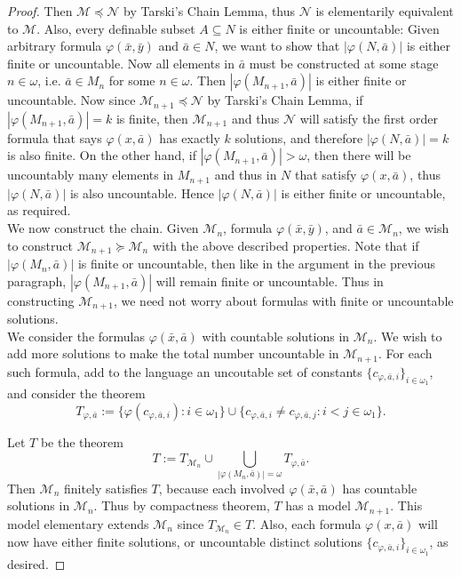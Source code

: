 \documentclass{article}
\begin{document}
\begin{enumerate}[label={\bf Q\arabic*:}]
\begin{proof}
      Then $\mathcal{M}\preceq\mathcal{N}$ by Tarski's Chain Lemma, thus
      $\mathcal{N}$ is elementarily equivalent to $\mathcal{M}$. Also,
      every definable subset $A\subseteq N$ is either finite or
      uncountable: Given arbitrary formula $\varphi(\bar{x},\bar{y})$ and
      $\bar{a}\in N$, we want to show that $|\varphi(N,\bar{a})|$ is
      either finite or uncountable. Now all elements in $\bar{a}$ must be
      constructed at some stage $n\in\omega$, i.e. $\bar{a}\in M_n$ for
      some $n\in\omega$. Then $|\varphi(M_{n+1},\bar{a})|$ is either finite
      or uncountable. Now since $\mathcal{M}_{n+1}\preceq\mathcal{N}$ by
      Tarski's Chain Lemma, if $|\varphi(M_{n+1},\bar{a})|=k$ is finite, then
      $\mathcal{M}_{n+1}$ and thus $\mathcal{N}$ will satisfy the first
      order formula that says $\varphi(x,\bar{a})$ has exactly $k$
      solutions, and therefore $|\varphi(N,\bar{a})|=k$ is also finite. On
      the other hand, if $|\varphi(M_{n+1},\bar{a})|>\omega$, then there
      will be uncountably many elements in $M_{n+1}$ and thus in $N$ that
      satisfy $\varphi(x,\bar{a})$, thus $|\varphi(N,\bar{a})|$ is also
      uncountable. Hence $|\varphi(N,\bar{a})|$ is either finite or
      uncountable, as required. \\

      We now construct the chain. Given $\mathcal{M}_n$, formula
      $\varphi(\bar{x},\bar{y})$, and $\bar{a}\in\mathcal{M}_n$, we wish to
      construct $\mathcal{M}_{n+1}\succeq\mathcal{M}_n$ with the above
      described properties. Note that if $|\varphi(M_n,\bar{a})|$ is finite
      or uncountable, then like in the argument in the previous paragraph,
      $|\varphi(M_{n+1},\bar{a})|$ will remain finite or uncountable. Thus
      in constructing $\mathcal{M}_{n+1}$, we need not worry about formulas
      with finite or uncountable solutions. \\

      We consider the formulas $\varphi(\bar{x},\bar{a})$ with countable
      solutions in $\mathcal{M}_n$. We wish to add more solutions to make
      the total number uncountable in $\mathcal{M}_{n+1}$. For each such
      formula, add to the language an uncoutable set of constants
      $\{c_{\varphi,\bar{a},i}\}_{i\in\omega_1}$, and consider the theorem
      \[T_{\varphi,\bar{a}}:= \{\varphi(c_{\varphi,\bar{a},i}):
        i\in\omega_1\} \cup \{c_{\varphi,\bar{a},i}\neq
        c_{\varphi,\bar{a},j}: i<j\in\omega_1\}.\]

      Let $T$ be the theorem
      \[T:= T_{\mathcal{M}_n}\cup \bigcup_{|\varphi(M_n,\bar{a})|=\omega}
        T_{\varphi,\bar{a}}.\]
      Then $\mathcal{M}_n$ finitely satisfies $T$, because each involved
      $\varphi(\bar{x},\bar{a})$ has countable solutions in
      $\mathcal{M}_n$. Thus by compactness theorem, $T$ has a model
      $\mathcal{M}_{n+1}$. This model elementary extends $\mathcal{M}_n$
      since $T_{\mathcal{M}_n}\in T$. Also, each formula
      $\varphi(x,\bar{a})$ will now have either finite solutions, or
      uncountable distinct solutions
      $\{c_{\varphi,\bar{a},i}\}_{i\in\omega_1}$, as desired.
    \end{proof}


\end{enumerate}
\end{document}
